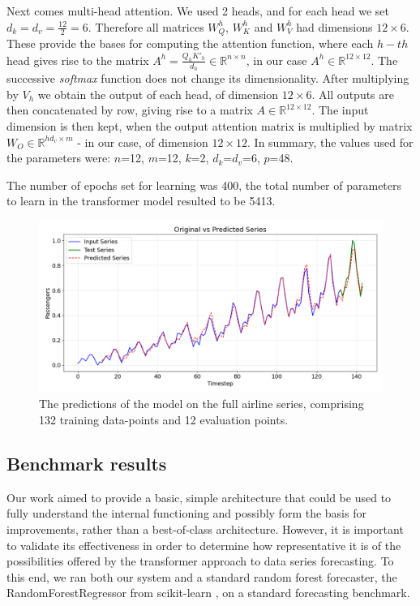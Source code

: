 \documentclass[algorithms,article,submit,pdftex,moreauthors]{Definitions/mdpi}
\begin{document}
Next comes multi-head attention. We used 2 heads, and for each head we set $d_k = d_v = \frac{12}{2} = 6$. Therefore all matrices $W^h_Q$, $W^h_K$ and $W^h_V$ had dimensions $12 \times 6$. These provide the bases for computing the attention function, where each $h-th$ head gives rise to the matrix $A^h=\frac{Q_hK'_h}{d_h} \in \mathbb{R}^{n \times n}$, in our case $A^h \in \mathbb{R}^{12 \times 12}$. The successive {\em softmax} function does not change its dimensionality. After multiplying by $V_h$ we obtain the output of each head, of dimension $12 \times 6$. All outputs are then concatenated by row, giving rise to a matrix $A \in \mathbb{R}^{12 \times 12}$. The input dimension is then kept, when the output attention matrix is multiplied by matrix $W_O \in \mathbb{R}^{hd_v \times m}$ - in our case, of dimension $12 \times 12$. In summary, the values used for the parameters were: $n$=12, $m$=12, $k$=2,  $d_k$=$d_v$=6, $p$=48. 

The number of epochs set for learning was 400, the total number of parameters to learn in the transformer model resulted to be 5413.

\begin{figure}
	\centering
	\includegraphics[width=1.0\linewidth]{airlines.png}
	\caption{The predictions of the model on the full airline series, comprising 132 training data-points and 12 evaluation points.}
	\label{fig:airlines}
\end{figure}

\subsection{Benchmark results} \label{subsec:benchmark}

Our work aimed to provide a basic, simple architecture that could be used to fully understand the internal functioning and possibly form the basis for improvements, rather than a best-of-class architecture. However, it is important to validate its effectiveness in order to determine how representative it is of the possibilities offered by the transformer approach to data series forecasting. To this end, we ran both our system and a standard random forest forecaster, the RandomForestRegressor from scikit-learn \cite{GEW06}, on a standard forecasting benchmark.
\end{document}
